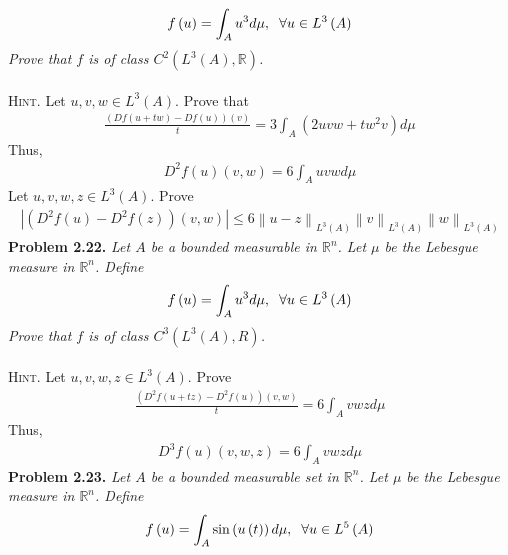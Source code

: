 \documentclass[a4paper]{article}
\numberwithin{equation}{section}
\begin{document}
\begin{align}
f\left( u \right) = \int_A {{u^3}d\mu } ,\hspace{0.2cm}\forall u \in {L^3}\left( A \right)
\end{align}
\textit{Prove that $f$ is of class ${C^2}\left( {{L^3}\left( A \right),\mathbb{R}} \right)$.}\\
\\
\textsc{Hint.} Let $u,v,w \in L^3\left(A\right)$. Prove that
\begin{align}
\frac{{\left( {Df\left( {u + tw} \right) - Df\left( u \right)} \right)\left( v \right)}}{t} = 3\int_A {\left( {2uvw + t{w^2}v} \right)d\mu } 
\end{align}
Thus,
\begin{align}
{D^2}f\left( u \right)\left( {v,w} \right) = 6\int_A {uvwd\mu } 
\end{align}
Let $u,v,w,z\in L^3\left(A\right)$. Prove
\begin{align}
\left| {\left( {{D^2}f\left( u \right) - {D^2}f\left( z \right)} \right)\left( {v,w} \right)} \right| \le 6{\left\| {u - z} \right\|_{{L^3}\left( A \right)}}{\left\| v \right\|_{{L^3}\left( A \right)}}{\left\| w \right\|_{{L^3}\left( A \right)}}
\end{align}
\textbf{Problem 2.22.} \textit{Let $A$ be a bounded measurable in $\mathbb{R}^n$. Let $\mu$ be the Lebesgue measure in $\mathbb{R}^n$. Define}
\begin{align}
f\left( u \right) = \int_A {{u^3}d\mu } ,\hspace{0.2cm}\forall u \in {L^3}\left( A \right)
\end{align}
\textit{Prove that $f$ is of class ${C^3}\left( {{L^3}\left( A \right),R} \right)$.}\\
\\
\textsc{Hint.} Let $u,v,w,z \in L^3\left(A\right)$. Prove 
\begin{align}
\frac{{\left( {{D^2}f\left( {u + tz} \right) - {D^2}f\left( u \right)} \right)\left( {v,w} \right)}}{t} = 6\int_A {vwzd\mu } 
\end{align}
Thus, 
\begin{align}
{D^3}f\left( u \right)\left( {v,w,z} \right) = 6\int_A {vwzd\mu } 
\end{align}
\textbf{Problem 2.23.} \textit{Let $A$ be a bounded measurable set in $\mathbb{R}^n$. Let $\mu$ be the Lebesgue measure in $\mathbb{R}^n$. Define}
\begin{align}
f\left( u \right) = \int_A {\sin \left( {u\left( t \right)} \right)d\mu } ,\hspace{0.2cm}\forall u \in {L^5}\left( A \right)
\end{align}
\end{document}
